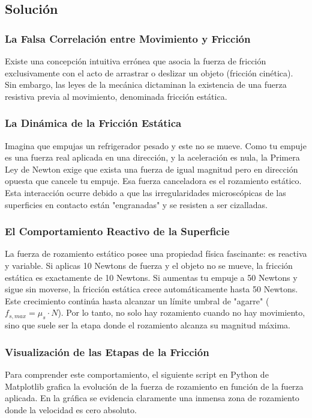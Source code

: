 \documentclass[12pt]{article}
\begin{document}
\subsection*{Solución}

\subsubsection*{La Falsa Correlación entre Movimiento y Fricción}
Existe una concepción intuitiva errónea que asocia la fuerza de fricción exclusivamente con el acto de arrastrar o deslizar un objeto (fricción cinética). Sin embargo, las leyes de la mecánica dictaminan la existencia de una fuerza resistiva previa al movimiento, denominada fricción estática. 

\subsubsection*{La Dinámica de la Fricción Estática}
Imagina que empujas un refrigerador pesado y este no se mueve. Como tu empuje es una fuerza real aplicada en una dirección, y la aceleración es nula, la Primera Ley de Newton exige que exista una fuerza de igual magnitud pero en dirección opuesta que cancele tu empuje. Esa fuerza canceladora es el rozamiento estático. Esta interacción ocurre debido a que las irregularidades microscópicas de las superficies en contacto están "engranadas" y se resisten a ser cizalladas.

\subsubsection*{El Comportamiento Reactivo de la Superficie}
La fuerza de rozamiento estático posee una propiedad física fascinante: es reactiva y variable. Si aplicas 10 Newtons de fuerza y el objeto no se mueve, la fricción estática es exactamente de 10 Newtons. Si aumentas tu empuje a 50 Newtons y sigue sin moverse, la fricción estática crece automáticamente hasta 50 Newtons. Este crecimiento continúa hasta alcanzar un límite umbral de "agarre" ($f_{s,max} = \mu_s \cdot N$). Por lo tanto, no solo hay rozamiento cuando no hay movimiento, sino que suele ser la etapa donde el rozamiento alcanza su magnitud máxima.

\subsubsection*{Visualización de las Etapas de la Fricción}
Para comprender este comportamiento, el siguiente script en Python de Matplotlib grafica la evolución de la fuerza de rozamiento en función de la fuerza aplicada. En la gráfica se evidencia claramente una inmensa zona de rozamiento donde la velocidad es cero absoluto.
\end{document}
